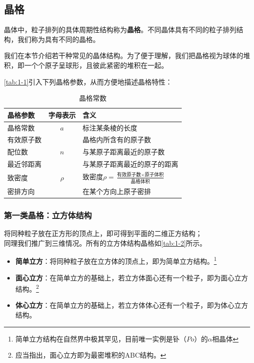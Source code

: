 \subsection{晶格}
    晶体中，粒子排列的具体周期性结构称为\textbf{晶格}。不同晶体具有不同的粒子排列结构，我们称为具有不同的晶格。
    
    我们在本节介绍若干种常见的晶体结构。为了便于理解，我们把晶格视为球体的堆积，即一个个原子呈球形，且彼此紧密的堆积在一起。

    \autoref{tab:1-1}引入下列晶格参数，从而方便地描述晶格特性：
    \begin{table}[!htbp]
        \centering
        \setlength{\tabcolsep}{1em}
        \begin{tabular}{lcl}
            \toprule
            晶格参数    &   字母表示    &   含义    \\
            \midrule
            晶格常数    &   $a$     &   标注某条棱的长度\\
            有效原子数  &           &   晶格内所含有的原子数\\
            配位数      &   $n$     &   与某原子距离最近的原子数\\
            最近邻距离  &           &   与某原子距离最近的原子的距离\\
            致密度      &   $\rho$  &   $\mbox{致密度}\rho=\frac{\mbox{有效原子数}\times \mbox{原子体积}}{\mbox{晶格体积}}$\\
            密排方向    &           &   在某个方向上原子密排\\
            \bottomrule
        \end{tabular}
        \caption{晶格常数}
        \label{tab:1-1}
    \end{table}

\newpage 
\subsubsection{第一类晶格：立方体结构}
    将同种粒子放在正方形的顶点上，即可得到平面的二维正方结构；\\
    同理我们推广到三维情况。所有的立方体结构晶格如\autoref{tab:1-2}所示。
    \begin{itemize}[itemsep=0pt,parsep=0pt]
        \item \textbf{简单立方}：将同种粒子放在立方体的顶点上，即为简单立方结构。\footnote{简单立方结构在自然界中极其罕见，目前唯一实例是钋（$Po$）的$\alpha$相晶体}
        \item \textbf{面心立方}：在简单立方的基础上，若立方体面心还有一个粒子，即为面心立方结构。\footnote{应当指出，面心立方即为最密堆积的ABC结构。}
        \item \textbf{体心立方}：在简单立方的基础上，若立方体体心还有一个粒子，即为体心立方结构。
    \end{itemize}

